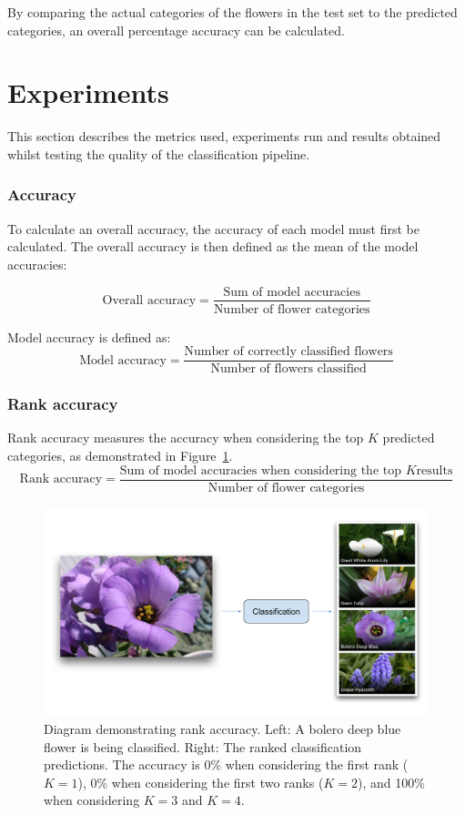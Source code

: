 \documentclass[11pt, a4paper]{report}
\begin{document}
By comparing the actual categories of the flowers in the test set to the predicted categories, an overall percentage accuracy can be calculated.


\section{Experiments}

This section describes the metrics used, experiments run and results obtained whilst testing the quality of the classification pipeline. 

\subsubsection{Accuracy}

To calculate an overall accuracy, the accuracy of each model must first be calculated. The overall accuracy is then defined as the mean of the model accuracies:

$$
\text{Overall accuracy}  = \frac{\text{Sum of model accuracies}}{\text{Number of flower categories}}
$$

Model accuracy is defined as:
$$
\text{Model accuracy} = \frac{\text{Number of correctly classified flowers}}{\text{Number of flowers classified}}
$$

\subsubsection{Rank accuracy}

Rank accuracy measures the accuracy when considering the top $K$ predicted categories, as demonstrated in Figure~\ref{img:50}. 
$$
\text{Rank accuracy}  = \frac{\text{Sum of model accuracies when considering the top } K \text{results}}{\text{Number of flower categories}}
$$

\begin{figure}[hbt]
	\centering
  \includegraphics[totalheight=8.5cm]{img/50.png}
  \caption{Diagram demonstrating rank accuracy. Left: A bolero deep blue flower is being classified. Right: The ranked classification predictions. The accuracy is 0\% when considering the first rank ($K = 1$), 0\% when considering the first two ranks ($K = 2$), and 100\% when considering $K = 3$ and $K = 4$.}
  \label{img:50}
\end{figure}
\end{document}
